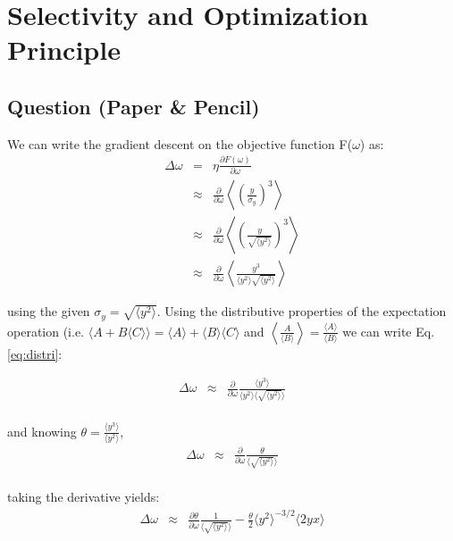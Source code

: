 \clearpage
\section{Selectivity and Optimization Principle}
\subsection{Question (Paper \& Pencil)} 
\label{sec:obj_fcn}
We can write the gradient descent on the objective function F($\omega$) as:
\begin{eqnarray}
\Delta \omega&=&\eta \frac{\partial F(\omega)}{\partial \omega} \\
&\approx&\frac{\partial }{\partial \omega} \left\langle \left(\frac{y}{\sigma_y}\right)^3 \right\rangle \\
&\approx&\frac{\partial }{\partial \omega} \left\langle \left(\frac{y}{\sqrt{\langle y^2\rangle}}\right)^3 \right\rangle \\
&\approx&\frac{\partial }{\partial \omega} \left\langle \frac{y^3}{\langle y^2\rangle  \sqrt{\langle y^2\rangle}} \right\rangle
\end{eqnarray}

using the given $\sigma_y = \sqrt{\langle y^2\rangle}$. Using the distributive properties of the expectation operation (i.e. $\langle A + B \langle C\rangle\rangle = \langle A  \rangle + \langle B\rangle \langle C\rangle$ and $\left\langle \frac{A}{\langle B\rangle}\right\rangle = \frac{\langle A  \rangle}{\langle B  \rangle}$ we can write Eq. \ref{eq:distri}: 

\begin{eqnarray}
\Delta \omega&\approx& \frac{\partial }{\partial \omega}  \frac{\langle y^3 \rangle}{\langle y^2 \rangle \langle \sqrt{\langle y^2 \rangle}\rangle}  \label{eq:distri}\\
\end{eqnarray}

and knowing $\theta = \frac{\langle y^3\rangle}{\langle y^2\rangle}$, 
\begin{eqnarray}
\Delta \omega&\approx& \frac{\partial }{\partial \omega}  \frac{\theta}{ \langle \sqrt{\langle y^2 \rangle}\rangle} \\
\end{eqnarray}

taking the derivative yields: 
\begin{eqnarray}
\Delta \omega&\approx& \frac{\partial \theta}{\partial \omega}  \frac{1}{ \langle \sqrt{\langle y^2 \rangle}\rangle} -  \frac{\theta}{2}  {\langle y^2 \rangle}^{-3/2} \langle 2y x \rangle \label{eq:delta_omega}
\end{eqnarray}

